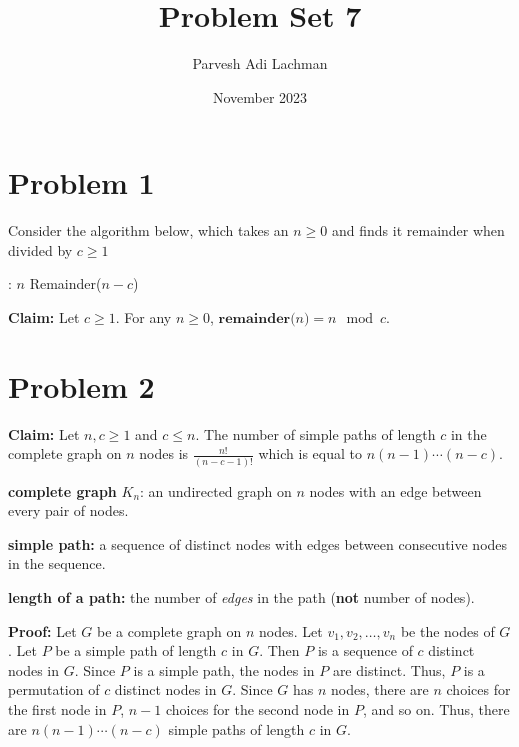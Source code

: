\documentclass{article}
\title{Problem Set 7}
\author{Parvesh Adi Lachman}
\date{November 2023}
\begin{document}
\maketitle
\section{Problem 1}

Consider the algorithm below, which takes an $n\geq 0$ and finds it remainder when divided by $c\geq 1$

\vspace{15pt}
\begin{algorithmic}
:
\State \Return $n$
\Else
\State \Return Remainder($n-c$)
\EndIf
\EndFunction
\end{algorithmic}

\vspace{10pt}

\textbf{Claim:} Let $c\geq 1$. For any $n\geq 0$, $\textbf{remainder($n$)}=n\mod c$.




\pagebreak

\section{Problem 2}

\textbf{Claim:} Let $n,c\geq 1$ and $c\leq n$. The number of simple paths of length $c$ in the complete graph on $n$ nodes is $\frac{n!}{(n-c-1)!}$ which is equal to $n(n-1)\cdots (n-c)$.

\vspace{10pt}

\textbf{complete graph} $K_n$: an undirected graph on $n$ nodes with an edge between every pair of nodes.
\vspace{5pt}

\textbf{simple path:} a sequence of distinct nodes with edges between consecutive nodes in the sequence.
\vspace{5pt}

\textbf{length of a path:} the number of \textit{edges} in the path (\textbf{not} number of nodes).
\vspace{5pt}

\textbf{Proof:} Let $G$ be a complete graph on $n$ nodes. Let $v_1,v_2,\ldots,v_n$ be the nodes of $G$. Let $P$ be a simple path of length $c$ in $G$. Then $P$ is a sequence of $c$ distinct nodes in $G$. Since $P$ is a simple path, the nodes in $P$ are distinct. Thus, $P$ is a permutation of $c$ distinct nodes in $G$. Since $G$ has $n$ nodes, there are $n$ choices for the first node in $P$, $n-1$ choices for the second node in $P$, and so on. Thus, there are $n(n-1)\cdots (n-c)$ simple paths of length $c$ in $G$.
\end{document}
